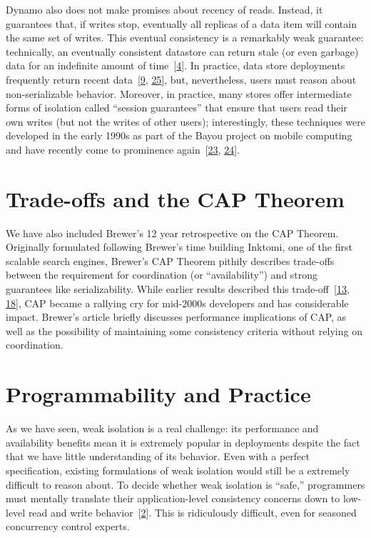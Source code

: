 \documentclass[b5paper,11pt,twoside,openright]{book}
\newcommand\Section[2]{
  \hypertarget{#1}{
    \section{#2}
  }
}
\begin{document}
Dynamo also does not make promises about recency of reads. Instead, it
guarantees that, if writes stop, eventually all replicas of a data item
will contain the same set of writes. This eventual consistency is a
remarkably weak guarantee: technically, an eventually consistent
datastore can return stale (or even garbage) data for an indefinite
amount of time~{{[}\protect\hyperlink{ref-ec-queue}{4}{]}}. In practice,
data store deployments frequently return recent
data~{{[}\protect\hyperlink{ref-pbs}{9},
  \protect\hyperlink{ref-wada}{25}{]}}, but, nevertheless, users must
reason about non-serializable behavior. Moreover, in practice, many
stores offer intermediate forms of isolation called ``session
guarantees'' that ensure that users read their own writes (but not the
writes of other users); interestingly, these techniques were developed
in the early 1990s as part of the Bayou project on mobile computing and
have recently come to prominence
again~{{[}\protect\hyperlink{ref-terry-baseball}{23},
  \protect\hyperlink{ref-bayou-session}{24}{]}}.

\Section{trade-offs-and-the-cap-theorem}{
Trade-offs and the CAP Theorem
}

We have also included Brewer's 12 year retrospective on the CAP Theorem.
Originally formulated following Brewer's time building Inktomi, one of
the first scalable search engines, Brewer's CAP Theorem pithily
describes trade-offs between the requirement for coordination (or
``availability'') and strong guarantees like serializability. While
earlier results described this
trade-off~{{[}\protect\hyperlink{ref-davidson-survey}{13},
  \protect\hyperlink{ref-caprfc}{18}{]}}, CAP became a rallying cry for
mid-2000s developers and has considerable impact. Brewer's article
briefly discusses performance implications of CAP, as well as the
possibility of maintaining some consistency criteria without relying on
coordination.

\Section{programmability-and-practice}{%
Programmability and Practice
}

As we have seen, weak isolation is a real challenge: its performance and
availability benefits mean it is extremely popular in deployments
despite the fact that we have little understanding of its behavior. Even
with a perfect specification, existing formulations of weak isolation
would still be a extremely difficult to reason about. To decide whether
weak isolation is ``safe,'' programmers must mentally translate their
application-level consistency concerns down to low-level read and write
behavior~{{[}\protect\hyperlink{ref-consistency-borders}{2}{]}}. This is
ridiculously difficult, even for seasoned concurrency control experts.
\end{document}
